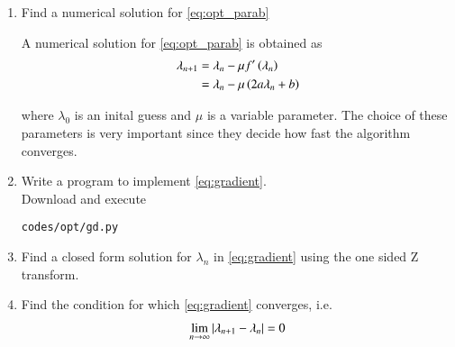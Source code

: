 
\begin{enumerate}[label=\thesection.\arabic*.,ref=\thesection.\theenumi]

%
%

\item
Find a numerical solution for \eqref{eq:opt_parab}

%
%
\solution
A numerical solution for \eqref{eq:opt_parab} is obtained as
%
\begin{align}
\lambda_{n+1}&=\lambda_{n}-\mu f^{\prime}\left(\lambda_n\right)
\\
&=\lambda_{n} -\mu \left(2a\lambda_n+b\right)
\label{eq:gradient}
\end{align}

%
where $\lambda_0$ is an inital guess and $\mu$ is a variable parameter. The choice of these parameters is very important since they decide how fast the algorithm converges.
%
\item
Write a program to implement \eqref{eq:gradient}.
%
\\
\solution Download and execute
\begin{lstlisting}
codes/opt/gd.py
\end{lstlisting}
%
\item Find a closed form solution for $\lambda_n$ in  \eqref{eq:gradient} using the one sided Z transform.
%
\item Find the condition for which \eqref{eq:gradient} converges, i.e.
\begin{align}
\lim_{n \to \infty}\left\vert\lambda_{n+1}-\lambda_n\right\vert = 0
\end{align}
\end{enumerate}
